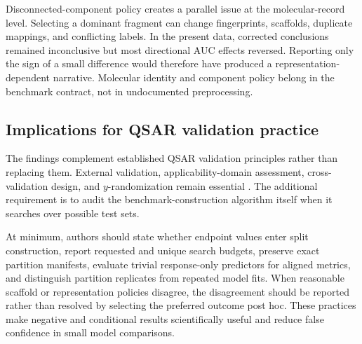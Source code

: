 Disconnected-component policy creates a parallel issue at the molecular-record level. Selecting a dominant fragment can change fingerprints, scaffolds, duplicate mappings, and conflicting labels. In the present data, corrected conclusions remained inconclusive but most directional AUC effects reversed. Reporting only the sign of a small difference would therefore have produced a representation-dependent narrative. Molecular identity and component policy belong in the benchmark contract, not in undocumented preprocessing.

\subsection{Implications for QSAR validation practice}

The findings complement established QSAR validation principles rather than replacing them. External validation, applicability-domain assessment, cross-validation design, and $y$-randomization remain essential \citep{tropsha2003earnest,gramatica2007principles,heberger2023validation,rucker2007yrandomization}. The additional requirement is to audit the benchmark-construction algorithm itself when it searches over possible test sets.

At minimum, authors should state whether endpoint values enter split construction, report requested and unique search budgets, preserve exact partition manifests, evaluate trivial response-only predictors for aligned metrics, and distinguish partition replicates from repeated model fits. When reasonable scaffold or representation policies disagree, the disagreement should be reported rather than resolved by selecting the preferred outcome post hoc. These practices make negative and conditional results scientifically useful and reduce false confidence in small model comparisons.
